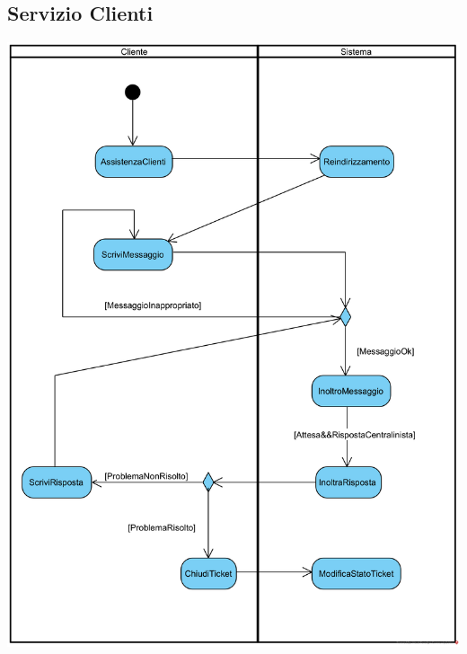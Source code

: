 \documentclass[12pt,a4paper]{article}
\begin{document}
\subsection{Servizio Clienti}
\begin{center}
\includegraphics[width=\textwidth]{ActivityDiagram/CreazioneTicket}
\end{center}
\end{document}
